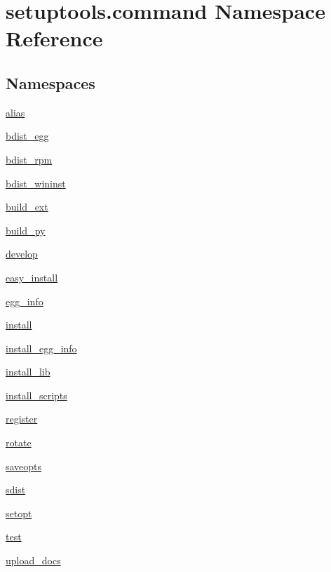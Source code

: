 \hypertarget{namespacesetuptools_1_1command}{}\section{setuptools.\+command Namespace Reference}
\label{namespacesetuptools_1_1command}
\subsection*{Namespaces}
\begin{DoxyCompactItemize}
\item 
 \hyperlink{namespacesetuptools_1_1command_1_1alias}{alias}
\item 
 \hyperlink{namespacesetuptools_1_1command_1_1bdist__egg}{bdist\+\_\+egg}
\item 
 \hyperlink{namespacesetuptools_1_1command_1_1bdist__rpm}{bdist\+\_\+rpm}
\item 
 \hyperlink{namespacesetuptools_1_1command_1_1bdist__wininst}{bdist\+\_\+wininst}
\item 
 \hyperlink{namespacesetuptools_1_1command_1_1build__ext}{build\+\_\+ext}
\item 
 \hyperlink{namespacesetuptools_1_1command_1_1build__py}{build\+\_\+py}
\item 
 \hyperlink{namespacesetuptools_1_1command_1_1develop}{develop}
\item 
 \hyperlink{namespacesetuptools_1_1command_1_1easy__install}{easy\+\_\+install}
\item 
 \hyperlink{namespacesetuptools_1_1command_1_1egg__info}{egg\+\_\+info}
\item 
 \hyperlink{namespacesetuptools_1_1command_1_1install}{install}
\item 
 \hyperlink{namespacesetuptools_1_1command_1_1install__egg__info}{install\+\_\+egg\+\_\+info}
\item 
 \hyperlink{namespacesetuptools_1_1command_1_1install__lib}{install\+\_\+lib}
\item 
 \hyperlink{namespacesetuptools_1_1command_1_1install__scripts}{install\+\_\+scripts}
\item 
 \hyperlink{namespacesetuptools_1_1command_1_1register}{register}
\item 
 \hyperlink{namespacesetuptools_1_1command_1_1rotate}{rotate}
\item 
 \hyperlink{namespacesetuptools_1_1command_1_1saveopts}{saveopts}
\item 
 \hyperlink{namespacesetuptools_1_1command_1_1sdist}{sdist}
\item 
 \hyperlink{namespacesetuptools_1_1command_1_1setopt}{setopt}
\item 
 \hyperlink{namespacesetuptools_1_1command_1_1test}{test}
\item 
 \hyperlink{namespacesetuptools_1_1command_1_1upload__docs}{upload\+\_\+docs}
\end{DoxyCompactItemize}
